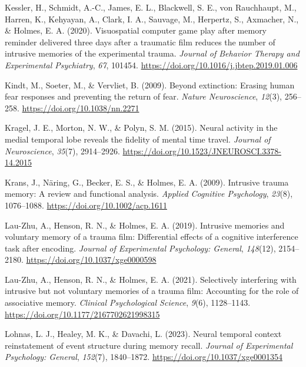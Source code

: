 \documentclass[
  man,
  floatsintext,
  longtable,
  nolmodern,
  notxfonts,
  notimes,
  draftfirst,
  colorlinks=true,linkcolor=blue,citecolor=blue,urlcolor=blue]{apa7}
\newlength{\cslhangindent}
\newenvironment{CSLReferences}[2] %
 {\begin{list}{}{%
  \setlength{\itemindent}{0pt}
  \setlength{\leftmargin}{0pt}
  \setlength{\parsep}{0pt}
  \ifodd #1
   \setlength{\leftmargin}{\cslhangindent}
   \setlength{\itemindent}{-1\cslhangindent}
  \fi
  \setlength{\itemsep}{#2\baselineskip}}}
 {\end{list}}
\begin{document}
\begin{CSLReferences}{1}{0}
Kessler, H., Schmidt, A.-C., James, E. L., Blackwell, S. E., von
Rauchhaupt, M., Harren, K., Kehyayan, A., Clark, I. A., Sauvage, M.,
Herpertz, S., Axmacher, N., \& Holmes, E. A. (2020). Visuospatial
computer game play after memory reminder delivered three days after a
traumatic film reduces the number of intrusive memories of the
experimental trauma. \emph{Journal of Behavior Therapy and Experimental
Psychiatry}, \emph{67}, 101454.
\url{https://doi.org/10.1016/j.jbtep.2019.01.006}

Kindt, M., Soeter, M., \& Vervliet, B. (2009). Beyond extinction:
Erasing human fear responses and preventing the return of fear.
\emph{Nature Neuroscience}, \emph{12}(3), 256--258.
\url{https://doi.org/10.1038/nn.2271}

Kragel, J. E., Morton, N. W., \& Polyn, S. M. (2015). Neural activity in
the medial temporal lobe reveals the fidelity of mental time travel.
\emph{Journal of Neuroscience}, \emph{35}(7), 2914--2926.
\url{https://doi.org/10.1523/JNEUROSCI.3378-14.2015}

Krans, J., Näring, G., Becker, E. S., \& Holmes, E. A. (2009). Intrusive
trauma memory: A review and functional analysis. \emph{Applied Cognitive
Psychology}, \emph{23}(8), 1076--1088.
\url{https://doi.org/10.1002/acp.1611}

Lau-Zhu, A., Henson, R. N., \& Holmes, E. A. (2019). Intrusive memories
and voluntary memory of a trauma film: Differential effects of a
cognitive interference task after encoding. \emph{Journal of
Experimental Psychology: General}, \emph{148}(12), 2154--2180.
\url{https://doi.org/10.1037/xge0000598}

Lau-Zhu, A., Henson, R. N., \& Holmes, E. A. (2021). Selectively
interfering with intrusive but not voluntary memories of a trauma film:
Accounting for the role of associative memory. \emph{Clinical
Psychological Science}, \emph{9}(6), 1128--1143.
\url{https://doi.org/10.1177/2167702621998315}

Lohnas, L. J., Healey, M. K., \& Davachi, L. (2023). Neural temporal
context reinstatement of event structure during memory recall.
\emph{Journal of Experimental Psychology: General}, \emph{152}(7),
1840--1872. \url{https://doi.org/10.1037/xge0001354}


\end{CSLReferences}
\end{document}
